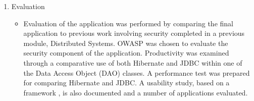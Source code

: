 \begin{enumerate}
\begin{itemize}
\end{itemize}
\item Evaluation
\begin{itemize}
\item Evaluation of the application was performed by comparing the final application to previous work involving security completed in a previous module, Distributed Systems. OWASP was chosen to evaluate the security component of the application. Productivity was examined through a comparative use of both Hibernate and JDBC within one of the Data Access Object (DAO) classes. A performance test was prepared for comparing Hibernate and JDBC. A usability study, based on a framework \parencite{holzinger2005usability}, is also documented and a number of applications evaluated.
\end{itemize}
\end{enumerate}
